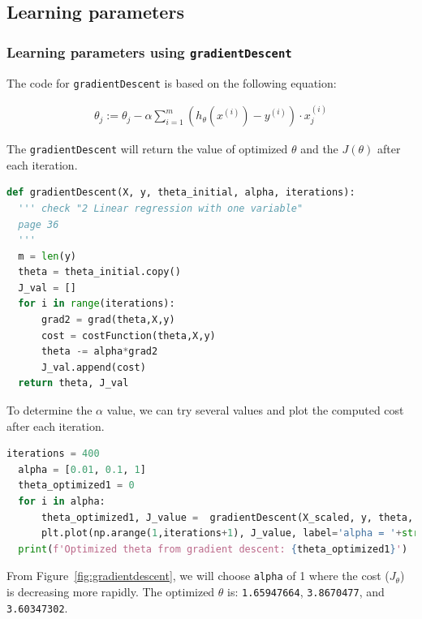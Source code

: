 \documentclass[12pt]{article}
\begin{document}
\subsection{Learning parameters}

\subsubsection{Learning parameters using \texttt{gradientDescent}} \label{section:grad}

The code for \texttt{gradientDescent} is based on the following equation:

\begin{align}
  \theta_j  := \theta_j - \alpha\sum_{i=1}^m{(h_\theta(x^{(i)})-y^{(i)})}\cdot x_j^{(i)}
\end{align}

The \texttt{gradientDescent} will return the value of optimized $\theta$ and the $J(\theta)$ after each iteration.

\begin{lstlisting}[language=Python]
  def gradientDescent(X, y, theta_initial, alpha, iterations):
  ''' check "2 Linear regression with one variable"
  page 36
  '''
  m = len(y)
  theta = theta_initial.copy()
  J_val = []
  for i in range(iterations):
      grad2 = grad(theta,X,y)
      cost = costFunction(theta,X,y)
      theta -= alpha*grad2
      J_val.append(cost)
  return theta, J_val
\end{lstlisting}

To determine the $\alpha$ value, we can try several values and plot the computed cost after each iteration. 

\begin{lstlisting}[language=Python]
  iterations = 400
  alpha = [0.01, 0.1, 1]
  theta_optimized1 = 0
  for i in alpha:
      theta_optimized1, J_value =  gradientDescent(X_scaled, y, theta, alpha=i, iterations=iterations)
      plt.plot(np.arange(1,iterations+1), J_value, label='alpha = '+str(i))
  print(f'Optimized theta from gradient descent: {theta_optimized1}')
\end{lstlisting}

From Figure~\ref{fig:gradientdescent}, we will choose \texttt{alpha} of 1 where the cost ($J_\theta$) is decreasing more rapidly. The optimized $\theta$ is: \texttt{1.65947664}, \texttt{3.8670477}, and \texttt{3.60347302}. 
\end{document}
